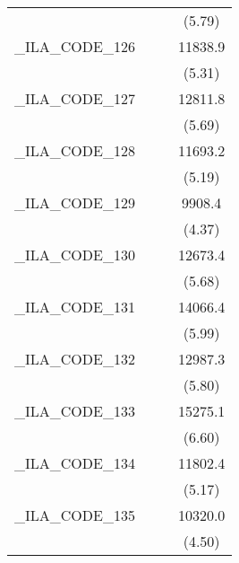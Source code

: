 {\begin{tabular}{l*{3}{c}}
            &                     &                     &      (5.79)         \\
[1em]
\_ILA\_CODE\_126&                     &                     &     11838.9\sym{***}\\
            &                     &                     &      (5.31)         \\
[1em]
\_ILA\_CODE\_127&                     &                     &     12811.8\sym{***}\\
            &                     &                     &      (5.69)         \\
[1em]
\_ILA\_CODE\_128&                     &                     &     11693.2\sym{***}\\
            &                     &                     &      (5.19)         \\
[1em]
\_ILA\_CODE\_129&                     &                     &      9908.4\sym{***}\\
            &                     &                     &      (4.37)         \\
[1em]
\_ILA\_CODE\_130&                     &                     &     12673.4\sym{***}\\
            &                     &                     &      (5.68)         \\
[1em]
\_ILA\_CODE\_131&                     &                     &     14066.4\sym{***}\\
            &                     &                     &      (5.99)         \\
[1em]
\_ILA\_CODE\_132&                     &                     &     12987.3\sym{***}\\
            &                     &                     &      (5.80)         \\
[1em]
\_ILA\_CODE\_133&                     &                     &     15275.1\sym{***}\\
            &                     &                     &      (6.60)         \\
[1em]
\_ILA\_CODE\_134&                     &                     &     11802.4\sym{***}\\
            &                     &                     &      (5.17)         \\
[1em]
\_ILA\_CODE\_135&                     &                     &     10320.0\sym{***}\\
            &                     &                     &      (4.50)         \\

\end{tabular}}
